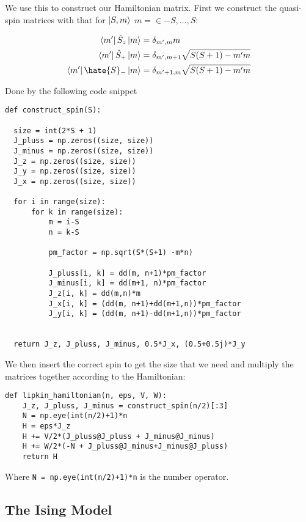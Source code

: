 We use this to construct our Hamiltonian matrix. First we construct the quasi-spin matrices with that for $\ket{S, m}$ $m =\in {-S, \dots, S}$:

\begin{align*}
  \bra{m'} \hat{S}_z \ket{m} &= \delta_{m',m}m \\
  \bra{m'} \hat{S}_+ \ket{m} &= \delta_{m', m+1}\sqrt{S(S+1)-m'm} \\
  \bra{m'} \hate{S}_- \ket{m} &= \delta_{m'+1, m}\sqrt{S(S+1)-m'm} \\
\end{align*}

Done by the following code snippet

\begin{verbatim}
def construct_spin(S):

  size = int(2*S + 1)
  J_pluss = np.zeros((size, size))
  J_minus = np.zeros((size, size))
  J_z = np.zeros((size, size))
  J_y = np.zeros((size, size))
  J_x = np.zeros((size, size))

  for i in range(size):
      for k in range(size):
          m = i-S
          n = k-S

          pm_factor = np.sqrt(S*(S+1) -m*n)

          J_pluss[i, k] = dd(m, n+1)*pm_factor
          J_minus[i, k] = dd(m+1, n)*pm_factor
          J_z[i, k] = dd(m,n)*m
          J_x[i, k] = (dd(m, n+1)+dd(m+1,n))*pm_factor
          J_y[i, k] = (dd(m, n+1)-dd(m+1,n))*pm_factor

  
  return J_z, J_pluss, J_minus, 0.5*J_x, (0.5+0.5j)*J_y
\end{verbatim}

We then insert the correct spin to get the size that we need and multiply the matrices together according to the Hamiltonian:

\begin{verbatim}
def lipkin_hamiltonian(n, eps, V, W):
    J_z, J_pluss, J_minus = construct_spin(n/2)[:3]
    N = np.eye(int(n/2)+1)*n
    H = eps*J_z 
    H += V/2*(J_pluss@J_pluss + J_minus@J_minus)
    H += W/2*(-N + J_pluss@J_minus+J_minus@J_pluss)
    return H
\end{verbatim}

Where \texttt{N = np.eye(int(n/2)+1)*n} is the number operator.

\subsection{The Ising Model}

